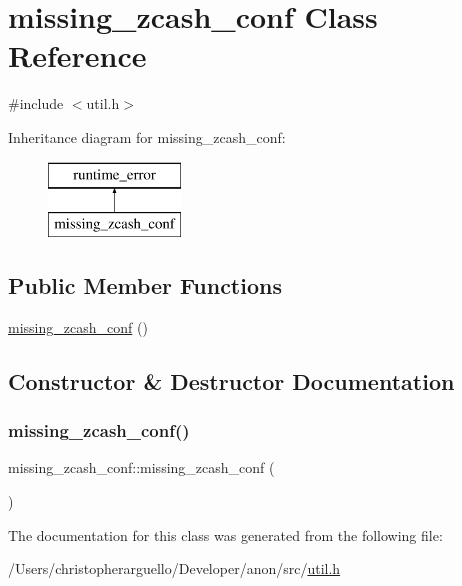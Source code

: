\hypertarget{classmissing__zcash__conf}{}\section{missing\+\_\+zcash\+\_\+conf Class Reference}
\label{classmissing__zcash__conf}


{\ttfamily \#include $<$util.\+h$>$}

Inheritance diagram for missing\+\_\+zcash\+\_\+conf\+:\begin{figure}[H]
\begin{center}
\leavevmode
\includegraphics[height=2.000000cm]{classmissing__zcash__conf}
\end{center}
\end{figure}
\subsection*{Public Member Functions}
\begin{DoxyCompactItemize}
\item 
\mbox{\hyperlink{classmissing__zcash__conf_a465db072ef540c097ad4bfc3701a680c}{missing\+\_\+zcash\+\_\+conf}} ()
\end{DoxyCompactItemize}


\subsection{Constructor \& Destructor Documentation}
\mbox{\label{classmissing__zcash__conf_a465db072ef540c097ad4bfc3701a680c}} 
\subsubsection{\texorpdfstring{missing\+\_\+zcash\+\_\+conf()}{missing\_zcash\_conf()}}
{\footnotesize\ttfamily missing\+\_\+zcash\+\_\+conf\+::missing\+\_\+zcash\+\_\+conf (\begin{DoxyParamCaption}{ }\end{DoxyParamCaption})\hspace{0.3cm}{\ttfamily [inline]}}



The documentation for this class was generated from the following file\+:\begin{DoxyCompactItemize}
\item 
/\+Users/christopherarguello/\+Developer/anon/src/\mbox{\hyperlink{util_8h}{util.\+h}}\end{DoxyCompactItemize}
